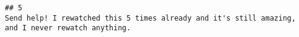 \documentclass[
]{article}
\begin{document}
\begin{verbatim}
## 5                                                                                                                                                                                                                                                                                                                                                                                                                                                                                                                                                                                                                                                                                                                                                                                                                                                                                                                                                                                                                                                                                                                                                                                                                                                                                                                                                                                                                                                                                                                                                                                                                                                                                                                                                                                                                                                                                                                                                                                                                                                                                                                                                                                                                                                                                                                                                    Send help! I rewatched this 5 times already and it's still amazing, and I never rewatch anything.

\end{verbatim}
\end{document}
